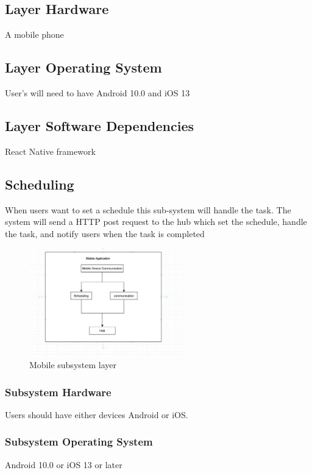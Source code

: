 \subsection{Layer Hardware}
A mobile phone

\subsection{Layer Operating System}
User’s will need to have Android 10.0 and iOS 13


\subsection{Layer Software Dependencies}
React Native framework

\subsection{Scheduling}
When users want to set a schedule this sub-system will handle the task. The system will send a HTTP post request to the hub which set the schedule, handle the task, and notify users when the task is completed

\begin{figure}[h!]
	\centering
 	\includegraphics[width=0.60\textwidth]{images/mobile}
 \caption{Mobile subsystem layer}
\end{figure}

\subsubsection{Subsystem Hardware}
Users should have either devices Android or iOS.

\subsubsection{Subsystem Operating System}
Android 10.0 or iOS 13 or later

